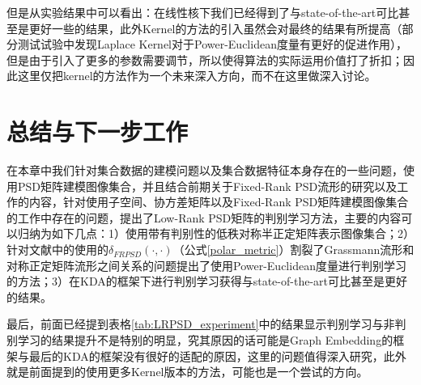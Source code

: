 但是从实验结果中可以看出：在线性核下我们已经得到了与state-of-the-art可比甚至是更好一些的结果，此外Kernel的方法的引入虽然会对最终的结果有所提高（部分测试试验中发现Laplace Kernel对于Power-Euclidean度量有更好的促进作用），但是由于引入了更多的参数需要调节，所以使得算法的实际运用价值打了折扣；因此这里仅把kernel的方法作为一个未来深入方向，而不在这里做深入讨论。
\section{总结与下一步工作}
在本章中我们针对集合数据的建模问题以及集合数据特征本身存在的一些问题，使用PSD矩阵建模图像集合，并且结合前期关于Fixed-Rank PSD流形的研究以及工作\cite{PSD_WACV}的内容，针对使用子空间、协方差矩阵以及Fixed-Rank PSD矩阵建模图像集合的工作\cite{PSD_WACV}中存在的问题，提出了Low-Rank PSD矩阵的判别学习方法，主要的内容可以归纳为如下几点：1）使用带有判别性的低秩对称半正定矩阵表示图像集合；2）针对文献\cite{PSD_WACV}中的使用的$\delta_{FRPSD}(\cdot,\cdot)$（公式\ref{polar_metric}）割裂了Grassmann流形和对称正定矩阵流形之间关系的问题提出了使用Power-Euclidean度量进行判别学习的方法；3）在KDA\cite{Kernel_KDA}的框架下进行判别学习获得与state-of-the-art可比甚至是更好的结果。

最后，前面已经提到表格\ref{tab:LRPSD_experiment}中的结果显示判别学习与非判别学习的结果提升不是特别的明显，究其原因的话可能是Graph Embedding的框架与最后的KDA的框架没有很好的适配的原因，这里的问题值得深入研究，此外就是前面提到的使用更多Kernel版本的方法，可能也是一个尝试的方向。